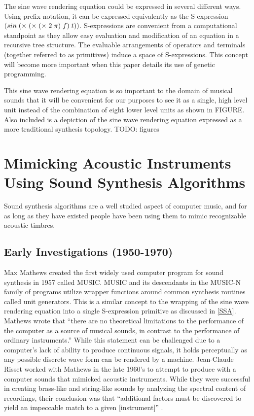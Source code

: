 \documentclass[12pt]{article}
\begin{document}
The sine wave rendering equation could be expressed in several different ways. Using prefix notation, it can be expressed equivalently as the S-expression $\sexp{({sin} (\times (\times (\times 2 \pi) f) t))}$. S-expressions are convenient from a computational standpoint as they allow easy evaluation and modification of an equation in a recursive tree structure. The evaluable arrangements of operators and terminals (together referred to as primitives) induce a space of S-expressions. This concept will become more important when this paper details its use of genetic programming.
	
This sine wave rendering equation is so important to the domain of musical sounds that it will be convenient for our purposes to see it as a single, high level unit instead of the combination of eight lower level units as shown in FIGURE. Also included is a depiction of the sine wave rendering equation expressed as a more traditional synthesis topology. TODO: figures
	
\section{Mimicking Acoustic Instruments Using Sound Synthesis Algorithms}
Sound synthesis algorithms are a well studied aspect of computer music, and for as long as they have existed people have been using them to mimic recognizable acoustic timbres.

\subsection{Early Investigations (1950-1970)}
Max Mathews created the first widely used computer program for sound synthesis in 1957 called MUSIC. MUSIC and its descendants in the MUSIC-N family of programs utilize wrapper functions around common synthesis routines called unit generators. This is a similar concept to the wrapping of the sine wave rendering equation into a single S-expression primitive as discussed in \ref{SSA}. Mathews wrote that ``there are no theoretical limitations to the performance of the computer as a source of musical sounds, in contrast to the performance of ordinary instruments.'' \citep{mathews01111963} While this statement can be challenged due to a computer's lack of ability to produce continuous signals, it holds perceptually as any possible discrete wave form can be rendered by a machine. Jean-Claude Risset worked with Mathews in the late 1960's to attempt to produce with a computer sounds that mimicked acoustic instruments. While they were successful in creating brass-like and string-like sounds by analyzing the spectral content of recordings, their conclusion was that ``additional factors must be discovered to yield an impeccable match to a given [instrument]'' \citep{risset1969analysis}.
\end{document}
